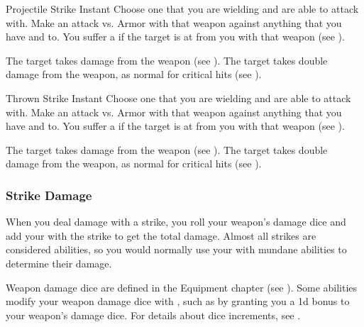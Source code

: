         \begin{instantability}{Projectile Strike}
            \label{Projectile Strike}
            Instant
            \rankline
            Choose one  that you are wielding and are able to attack with.
            Make an attack vs. Armor with that weapon against anything that you have  and  to.
            You suffer a  if the target is at  from you with that weapon (see ).

            \hit The target takes damage from the weapon (see ).
            \crit The target takes double damage from the weapon, as normal for critical hits (see ).
        \end{instantability}

        \begin{instantability}{Thrown Strike}
            \label{Thrown Strike}
            Instant
            \rankline
            Choose one  that you are wielding and are able to attack with.
            Make an attack vs. Armor with that weapon against anything that you have  and  to.
            You suffer a  if the target is at  from you with that weapon (see ).

            \hit The target takes damage from the weapon (see ).
            \crit The target takes double damage from the weapon, as normal for critical hits (see ).
        \end{instantability}

        \subsubsection{Strike Damage}\label{Strike Damage}
            When you deal damage with a strike, you roll your weapon's damage dice and add your  with the strike to get the total damage.
            Almost all strikes are considered  abilities, so you would normally use your  with mundane abilities to determine their damage.

            Weapon damage dice are defined in the Equipment chapter (see ).
            Some abilities modify your weapon damage dice with , such as by granting you a \plus1d bonus to your weapon's damage dice.
            For details about dice increments, see .

